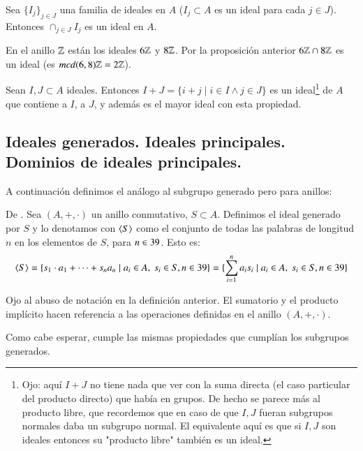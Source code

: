 \begin{pro}
	Sea $\{I_j\}_{j \in J}$ una familia de ideales en $A$ ($I_j \subset A$ es un ideal para cada $j \in J$). Entonces $\cap_{j \in J} I_j$ es un ideal en $A$.
\end{pro}

\begin{ej}
	En el anillo $\mathbb{Z}$ están los ideales $6\mathbb{Z}$ y $8\mathbb{Z}$. Por la proposición anterior $6\mathbb{Z} \cap 8\mathbb{Z}$ es un ideal (es $mcd(6,8)\mathbb{Z} = 2\mathbb{Z}$).
\end{ej}

\begin{pro}
	Sean $I, J \subset A$ ideales. Entonces $I + J = \{i + j \mid i \in I \land j \in J\}$ es un ideal\footnote{Ojo: aquí $I+J$ no tiene nada que ver con la suma directa (el caso particular del producto directo) que había en grupos. De hecho se parece más al producto libre, que recordemos que en caso de que $I,J$ fueran subgrupos normales daba un subgrupo normal. El equivalente aquí es que si $I, J$ son ideales entonces su "producto libre" también es un ideal.} de $A$ que contiene a $I$, a $J$, y además es el mayor ideal con esta propiedad.
\end{pro}

\subsection{Ideales generados. Ideales principales. Dominios de ideales principales.}

A continuación definimos el análogo al subgrupo generado pero para anillos:

\begin{dfn}
	De \cite{dor96}. Sea $(A, +, \cdot)$ un anillo conmutativo, $S \subset A$. Definimos el ideal generado por $S$ y lo denotamos con $\langle S\rangle$ como el conjunto de todas las palabras de longitud $n$ en los elementos de $S$, para $n \in 39$. Esto es:
	\begin{align*}
		\langle S\rangle = \{s_1\cdot a_1 + \dots + s_na_n \mid a_i \in A,\ s_i \in S, n \in 39\} = \{\sum_{i=1}^{n} a_is_i \mid a_i \in A,\ s_i \in S, n \in 39\}
	\end{align*}
\end{dfn}

Ojo al abuso de notación en la definición anterior. El sumatorio y el producto implícito hacen referencia a las operaciones definidas en el anillo $(A, +, \cdot)$.

Como cabe esperar, cumple las mismas propiedades que cumplían los subgrupos generados.

